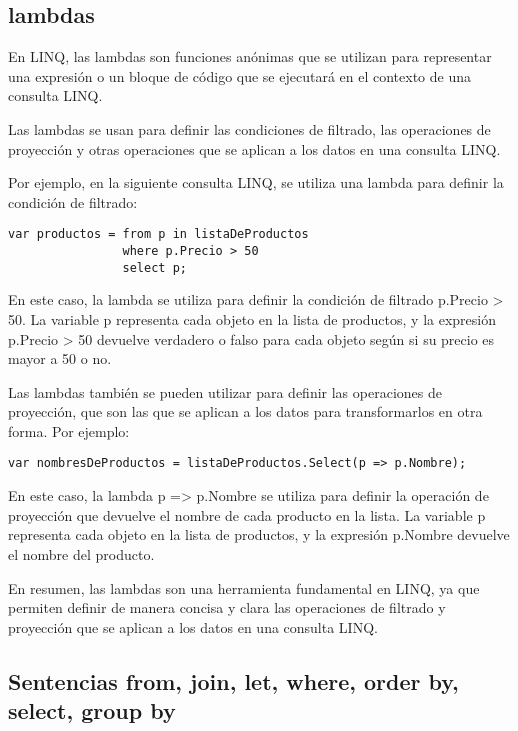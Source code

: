 \documentclass[executivepaper]{article}
\begin{document}
\subsection*{lambdas}

En LINQ, las lambdas son funciones anónimas que se utilizan para representar una expresión o un bloque de código que se ejecutará en el contexto de una consulta LINQ.

Las lambdas se usan para definir las condiciones de filtrado, las operaciones de proyección y otras operaciones que se aplican a los datos en una consulta LINQ.

Por ejemplo, en la siguiente consulta LINQ, se utiliza una lambda para definir la condición de filtrado:

\begin{lstlisting}
var productos = from p in listaDeProductos
                where p.Precio > 50
                select p;
\end{lstlisting}

En este caso, la lambda se utiliza para definir la condición de filtrado p.Precio > 50. La variable p representa cada objeto en la lista de productos, y la expresión p.Precio > 50 devuelve verdadero o falso para cada objeto según si su precio es mayor a 50 o no.

Las lambdas también se pueden utilizar para definir las operaciones de proyección, que son las que se aplican a los datos para transformarlos en otra forma. Por ejemplo:

\begin{lstlisting}
var nombresDeProductos = listaDeProductos.Select(p => p.Nombre);
\end{lstlisting}

En este caso, la lambda p => p.Nombre se utiliza para definir la operación de proyección que devuelve el nombre de cada producto en la lista. La variable p representa cada objeto en la lista de productos, y la expresión p.Nombre devuelve el nombre del producto.

En resumen, las lambdas son una herramienta fundamental en LINQ, ya que permiten definir de manera concisa y clara las operaciones de filtrado y proyección que se aplican a los datos en una consulta LINQ.

\subsection{Sentencias from, join, let, where, order by, select, group by}
\end{document}
